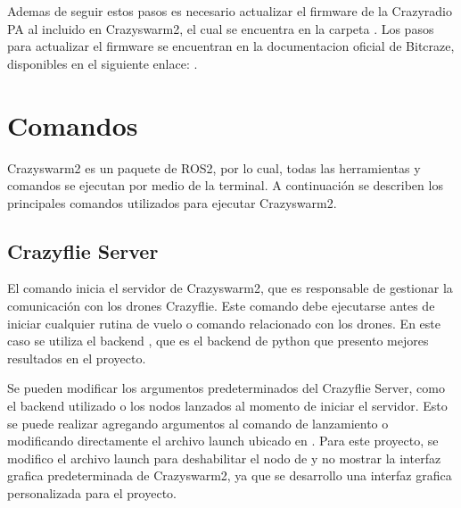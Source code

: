 \documentclass[a4paper,11pt,spanish]{sphinxmanual}
\let\sphinxpxdimen\pdfpxdimen\else\newdimen\sphinxpxdimen
\begin{document}
\sphinxAtStartPar
Ademas de seguir estos pasos es necesario actualizar el firmware de la Crazyradio PA al incluido en Crazyswarm2, el cual se encuentra en la carpeta . Los pasos para actualizar el firmware se encuentran en la documentacion oficial de Bitcraze, disponibles en el siguiente enlace: .

\sphinxstepscope


\chapter{Comandos}
\label{\detokenize{comandos:comandos}}\label{\detokenize{comandos::doc}}
\sphinxAtStartPar
Crazyswarm2 es un paquete de ROS2, por lo cual, todas las herramientas y comandos se ejecutan por medio de la terminal. A continuación se describen los principales comandos utilizados para ejecutar Crazyswarm2.


\section{Crazyflie Server}
\label{\detokenize{comandos:crazyflie-server}}
\sphinxAtStartPar
El comando  inicia el servidor de Crazyswarm2, que es responsable de gestionar la comunicación con los drones Crazyflie. Este comando debe ejecutarse antes de iniciar cualquier rutina de vuelo o comando relacionado con los drones. En este caso se utiliza el backend , que es el backend de python que presento mejores resultados en el proyecto.

\noindent{\hspace*{\fill}\sphinxincludegraphics[width=600\sphinxpxdimen]{{NodosCrazyswarm2}.png}\hspace*{\fill}}

\sphinxAtStartPar
Se pueden modificar los argumentos predeterminados del Crazyflie Server, como el backend utilizado o los nodos lanzados al momento de iniciar el servidor. Esto se puede realizar agregando argumentos al comando de lanzamiento o modificando directamente el archivo launch ubicado en . Para este proyecto, se modifico el archivo launch para deshabilitar el nodo de  y no mostrar la interfaz grafica predeterminada de Crazyswarm2, ya que se desarrollo una interfaz grafica personalizada para el proyecto.
\end{document}
